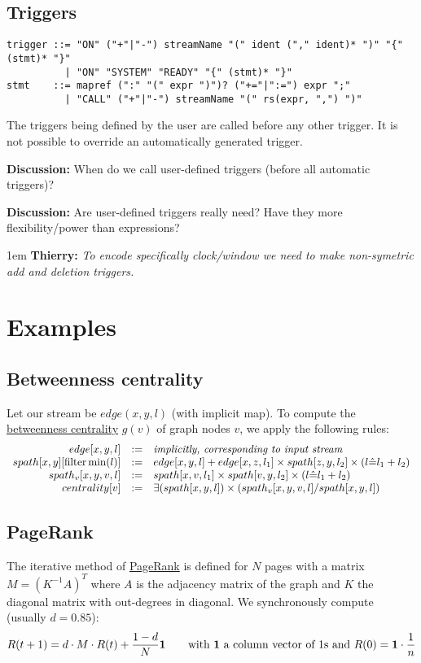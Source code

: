 \documentclass[11pt]{article}
\newlength{\dlen}
\def\discuss#1{\par\hspace{2em}
\setlength{\dlen}{\textwidth}
\addtolength{\dlen}{-2em}
\begin{minipage}{\dlen}\footnotesize {\bf\color{red} Discussion:} #1\end{minipage}\par}
\def\say#1#2{\begingroup\par\leftskip1em {\bf #1:} \it #2\par\endgroup}
\begin{document}
\subsection{Triggers}
\label{section:triggers}
\begin{verbatim}
trigger ::= "ON" ("+"|"-") streamName "(" ident ("," ident)* ")" "{" (stmt)* "}"
          | "ON" "SYSTEM" "READY" "{" (stmt)* "}"
stmt    ::= mapref (":" "(" expr ")")? ("+="|":=") expr ";"
          | "CALL" ("+"|"-") streamName "(" rs(expr, ",") ")"
\end{verbatim}
The triggers being defined by the user are called before any other trigger. It is not possible to override an automatically generated trigger.
\discuss{When do we call user-defined triggers (before all automatic triggers)?}
\discuss{Are user-defined triggers really need? Have they more flexibility/power than expressions?
\say{Thierry}{To encode specifically clock/window we need to make non-symetric add and deletion triggers.}
}
\newpage
\section{Examples}
\subsection{Betweenness centrality}
Let our stream be $edge(x,y,l)$ (with implicit map). To compute the \href{http://en.wikipedia.org/wiki/Betweenness_centrality}{betweenness centrality} $g(v)$ of graph nodes $v$, we apply the following rules:
\[\begin{array}{rcl}
edge[x,y,l] &:=& \text{\it implicitly, corresponding to input stream} \\
spath[x,y][{\rm filter} \min(l)] &:=& edge[x,y,l] +  edge[x,z,l_1] \times spath[z,y,l_2] \times (l\hat= l_1+l_2)\\
spath_v[x,y,v,l] &:=& spath[x,v,l_1] \times spath[v,y,l_2] \times (l\hat= l_1+l_2)\\
centrality[v] &:=& \exists(spath[x,y,l]) \times (spath_v[x,y,v,l] / spath[x,y,l])
\end{array}\]

\subsection{PageRank} \label{pb:pagerank}
The iterative method of \href{http://en.wikipedia.org/wiki/PageRank#Iterative}{PageRank} is defined for $N$ pages with a matrix $M=(K^{-1} A)^T$ where $A$ is the adjacency matrix of the graph and $K$ the diagonal matrix with out-degrees in diagonal. We synchronously compute (usually $d=0.85$):
\[R(t+1)=d\cdot M\cdot R(t)+\dfrac{1-d}{N}{\bf 1} \qquad \text{with {\bf 1} a column vector of 1s and }R(0)={\bf 1}\cdot \frac{1}{n}\]
\end{document}

